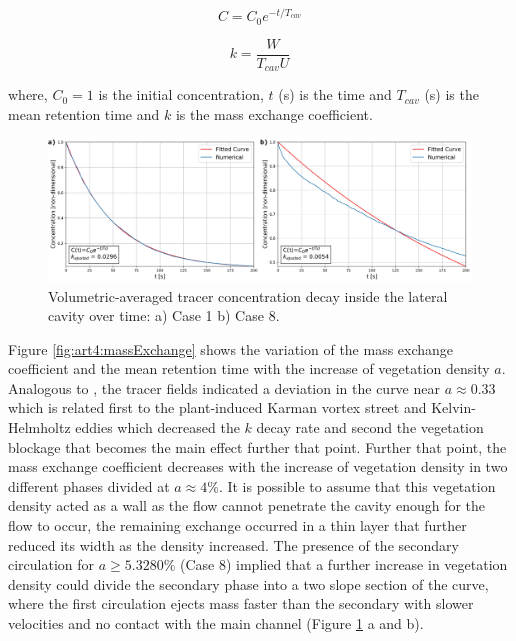 \begin{equation}
C=C_0 e^{-t/T_{cav}}
\label{eqn:art4:concentration}
\end{equation}

\begin{equation}
k=\frac{W}{T_{cav} U}
\label{eqn:art4:k}
\end{equation}

where, $C_0=1$ is the initial concentration, $t$ (s) is the time and $T_{cav}$ (s) is the mean retention time and $k$ is the mass exchange coefficient.

\begin{figure}[!ht]
\centering
\includegraphics[width=\linewidth]{../images/art4/massDecay.jpeg}
\caption{Volumetric-averaged tracer concentration decay inside the lateral cavity over time: a) Case 1 b) Case 8.}
\label{fig:art4:massConcentration}
\end{figure}

Figure \ref{fig:art4:massExchange} shows the variation of the mass exchange coefficient and the mean retention time with the increase of vegetation density $a$. Analogous to \textcite{xiang2019}, the tracer fields indicated a deviation in the curve near $a \approx 0.33$ which is related first to the plant-induced Karman vortex street and Kelvin-Helmholtz eddies \cite{Nepf2012} which decreased the $k$ decay rate and second the vegetation blockage that becomes the main effect further that point. Further that point, the mass exchange coefficient decreases with the increase of vegetation density in two different phases divided at $a \approx 4$\%. It is possible to assume that this vegetation density acted as a wall as the flow cannot penetrate the cavity enough for the flow to occur, the remaining exchange occurred in a thin layer that further reduced its width as the density increased. The presence of the secondary circulation for $a \geq 5.3280$\% (Case 8) implied that a further increase in vegetation density could divide the secondary phase into a two slope section of the curve, where the first circulation ejects mass faster than the secondary with slower velocities and no contact with the main channel \cite{deOliveira2020} (Figure \ref{fig:art4:massConcentration} a and b).

